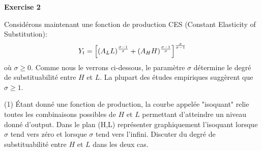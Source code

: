 \documentclass[11pt,a4paper]{article}
\begin{document}
\begin{center}
\textbf{Exercise 2}
\end{center}

Considérons maintenant une fonction de production CES (Constant Elasticity of Substitution): \begin{equation}\label{ces2}
Y_t=\left[  (A_L L)^{\frac{\sigma -1}{\sigma }}+  (A_HH)^{\frac{\sigma -1}{%
\sigma }}\right] ^{\frac{\sigma }{\sigma -1}}
\end{equation}
où $\sigma \geq 0$. Comme nous le verrons ci-dessous, le paramètre $\sigma$  détermine le degré de substituabilité entre $H$ et $L$.  La plupart des études empiriques suggèrent que $\sigma \geq 1$.
\bigskip

(1) Étant donné une fonction de production, la courbe appelée "isoquant"  relie toutes les combinaisons  possibles de $H$ et $L$   permettant d'atteindre un niveau donné d'output. Dans le plan (H,L) représenter graphiquement l'isoquant lorsque $\sigma$ tend vers zéro et lorsque $\sigma$ tend vers l'infini. Discuter du degré de substituabilité entre $H$ et $L$ dans les deux cas.  



\bigskip




\end{document}
